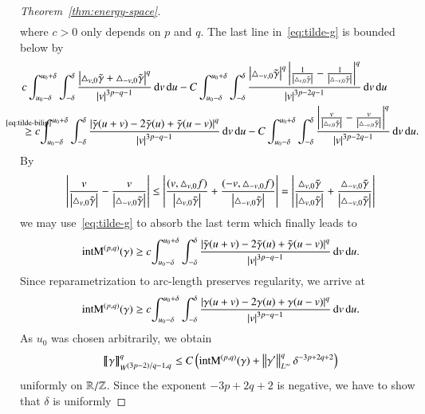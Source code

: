 \begin{proof}[Theorem~\ref{thm:energy-space}]
\begin{equation}
\begin{split}
\end{split}
\end{equation}
where $c>0$ only depends on $p$ and $q$.
The last line in~\eqref{eq:tilde-g} is bounded below by
\begin{align*}
 &c\int_{u_0-\delta}^{u_0+\delta}\int_{-\delta}^{\delta}
 \frac{\abs{{\T v0}+{{\T {-v}0}}}^{q}}{{\abs{v}^{3p-q-1}}}
 {\d v\d u}
 -C\int_{u_0-\delta}^{u_0+\delta}\int_{-\delta}^{\delta}
 \frac{\abs{{\T{-v}0}}^{q}\abs{\frac1{\abs{\T v0}}-\frac1{\abs{\T {-v}0}}}^{q}}{{\abs{v}^{3p-2q-1}}}
 {\d v\d u} \\
 &\refeq[\ge]{tilde-bilip} c{
 \int_{u_{0}-\delta}^{u_{0}+\delta}\int_{-\delta}^{\delta}
 \frac{\abs{\tg(u+v)-2\tg(u)+\tg(u-v)}^{q}}{\abs v^{3p-q-1}}\d v\d u
 }
 -C\int_{u_0-\delta}^{u_0+\delta}\int_{-\delta}^{\delta}
 \frac{\abs{\frac v{\abs{\T v0}}-\frac{v}{\abs{\T {-v}0}}}^{q}}{{\abs{v}^{3p-2q-1}}}
 {\d v\d u}.
\end{align*}
By
\[ \abs{\frac v{\abs{\T v0}}-\frac{v}{\abs{\T {-v}0}}}
   \le \abs{\frac{(v,\T[f]v0)}{\abs{\T v0}}+\frac{(-v,\T[f]{-v}0)}{\abs{\T {-v}0}}}
   = \abs{\fracabs{\T v0}+\fracabs{\T {-v}0}} \]
we may use~\eqref{eq:tilde-g} to absorb the last term
which finally leads to
\[ \E(\g)\ge c{
 \int_{u_{0}-\delta}^{u_{0}+\delta}\int_{-\delta}^{\delta}
 \frac{\abs{\tg(u+v)-2\tg(u)+\tg(u-v)}^{q}}{\abs v^{3p-q-1}}\d v\d u
 }. \]
%
Since reparametrization to arc-length preserves regularity, we arrive at
\begin{equation}\label{eq:delta-est}
 \E(\g)\ge c{
 \int_{u_{0}-\delta}^{u_{0}+\delta}\int_{-\delta}^{\delta}
 \frac{\abs{\g(u+v)-2\g(u)+\g(u-v)}^{q}}{\abs v^{3p-q-1}}\d v\d u
 }.
\end{equation}
As $u_{0}$ was chosen arbitrarily, we obtain
\begin{equation}\label{eq:semi-intM}
 {\seminormv{\g}}_{\W[(3p-2)/q-1,q]}^{q}
 \le C\br{\E(\g)+\lnorm[\infty]{\dg}^{q}\delta^{-3p+2q+2}}
\end{equation}
uniformly on $\R/\Z$.
Since the exponent $-3p+2q+2$ is negative,
we have to show that $\delta$ is uniformly

\end{proof}
